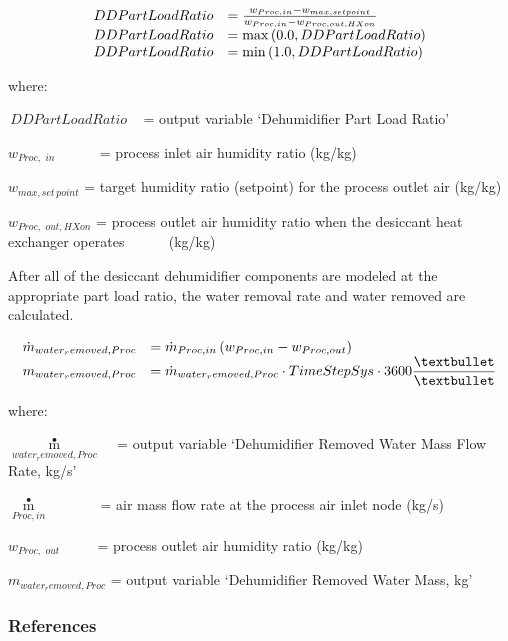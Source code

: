 \begin{equation}
  \begin{array}{rl}
    DDPartLoadRatio &= \frac{w_{Proc,in} - w_{max, setpoint}}{w_{Proc,in} - w_{Proc,out,HXon}} \\
    DDPartLoadRatio &= \max\PB{0.0,DDPartLoadRatio} \\
    DDPartLoadRatio &= \min\PB{1.0,DDPartLoadRatio}
  \end{array}
\end{equation}

where:

\(\,DDPartLoadRatio\) ~ = output variable `Dehumidifier Part Load Ratio'

\({w_{Proc,\,\,in}}\) ~~~~~ = process inlet air humidity ratio (kg/kg)

\({w_{max, set\,point}}\) = target humidity ratio (setpoint) for the process outlet air (kg/kg)

\({w_{Proc,\,\,out,HXon}}\) = process outlet air humidity ratio when the desiccant heat exchanger operates ~ ~~~~(kg/kg)

After all of the desiccant dehumidifier components are modeled at the appropriate part load ratio, the water removal rate and water removed are calculated.

\begin{equation}
  \begin{array}{rl}
    \dot{m}_{water_removed,Proc} & = \dot{m}_{Proc,in} \PB{w_{Proc,in} - w_{Proc,out}} \\
    m_{water_removed,Proc}       & = \dot{m}_{water_removed,Proc} \cdot TimeStepSys \cdot 3600\dfrac{•}{•}
  \end{array}
\end{equation}

where:

\({\mathop m\limits^ \bullet_{water_removed,Proc}}\) ~ = output variable `Dehumidifier Removed Water Mass Flow Rate, kg/s'

\({\mathop m\limits^ \bullet_{Proc,in}}\) ~~~~~~ = air mass flow rate at the process air inlet node (kg/s)

\({w_{Proc,\,\,out}}\) ~~~~ = process outlet air humidity ratio (kg/kg)

\({m_{water_removed,Proc}}\) = output variable `Dehumidifier Removed Water Mass, kg'

\subsubsection{References}\label{references-000}

